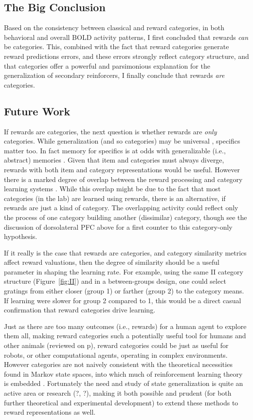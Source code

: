 \subsection{The Big Conclusion}
Based on the consistency between classical and reward categories, in both behavioral and overall BOLD activity patterns, I first concluded that rewards \emph{can} be categories.  This, combined with the fact that reward categories generate reward predictions errors, and these errors strongly reflect category structure, and that categories offer a powerful and parsimonious explanation for the generalization of secondary reinforcers, I finally conclude that rewards \emph{are} categories.


\subsection{Future Work}
\label{sub:future}
If rewards are categories, the next question is whether rewards are \emph{only} categories.  While generalization (and so categories) may be universal \cite{Shepard:1987p9102}, specifics matter too.  In fact memory for specifics is at odds with generalizable (i.e., abstract) memories \cite{Atallah:2004p5466}. Given that item and categories must always diverge, rewards with both item and category representations would be useful.  However there is a marked degree of overlap between the reward processing and category learning systems \cite{Seger:2010p7189,Ashby:2011p9148}.  While this overlap might be due to the fact that most categories (in the lab) are learned using rewards, there is an alternative, if rewards are just a kind of category.  The overlapping activity could reflect only the process of one category building another (dissimilar) category, though see the discussion of dorsolateral PFC above for a first counter to this category-only hypothesis.

If it really is the case that rewards are categories, and category similarity metrics affect reward valuations, then the degree of similarity should be a useful parameter in shaping the learning rate.  For example, using the same II category structure (Figure~\ref{fig:II}) and in a between-groups design, one could select gratings from either closer (group 1) or farther (group 2) to the category means. If learning were slower for group 2 compared to 1, this would be a direct casual confirmation that reward categories drive learning. 

Just as there are too many outcomes (i.e., rewards) for a human agent to explore them all, making reward categories such a potentially useful tool for humans and other animals (reviewed on p\pageref{sub:gen}), reward categories could be just as useful for robots, or other computational agents, operating in complex environments.   However categories are not naively consistent with the theoretical necessities found in Markov state spaces, into which much of reinforcement learning theory is embedded \cite{Sutton:1998p9247}.  Fortunately the need and study of state generalization is quite an active area or research (?, ?), making it both possible and prudent (for both further theoretical and experimental development) to extend these methods to reward representations as well. 
\clearpage